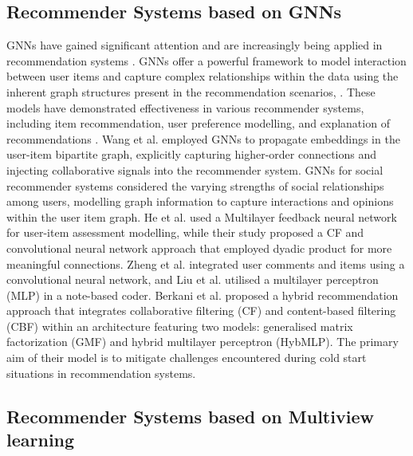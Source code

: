 \subsection{Recommender Systems based on GNNs}

     GNNs have gained significant attention and are increasingly being applied in recommendation systems \cite{gwadabe2022improving}. GNNs offer a powerful framework to model interaction between user items and capture complex relationships within the data using the inherent graph structures present in the recommendation scenarios,  \cite{wu2020diffnet++}. These models have demonstrated effectiveness in various recommender systems, including item recommendation, user preference modelling, and explanation of recommendations \cite{wang2019neural}. Wang et al. \cite{wang2019neural} employed GNNs to propagate embeddings in the user-item bipartite graph, explicitly capturing higher-order connections and injecting collaborative signals into the recommender system. GNNs for social recommender systems \cite{fan2019graph} considered the varying strengths of social relationships among users, modelling graph information to capture interactions and opinions within the user item graph. He et al. \cite{he2017neural} used a Multilayer feedback neural network for user-item assessment modelling, while their study \cite{he2018outer} proposed a CF and convolutional neural network approach that employed dyadic product for more meaningful connections. Zheng et al. \cite{zheng2017joint} integrated user comments and items using a convolutional neural network, and Liu et al. \cite{liu2020hybrid} utilised a multilayer perceptron (MLP) in a note-based coder. Berkani et al. \cite{berkani2022neural} proposed a hybrid recommendation approach that integrates collaborative filtering (CF) and content-based filtering (CBF) within an architecture featuring two models: generalised matrix factorization (GMF) and hybrid multilayer perceptron (HybMLP). The primary aim of their model is to mitigate challenges encountered during cold start situations in recommendation systems.
    
\subsection{Recommender Systems based on Multiview learning}

